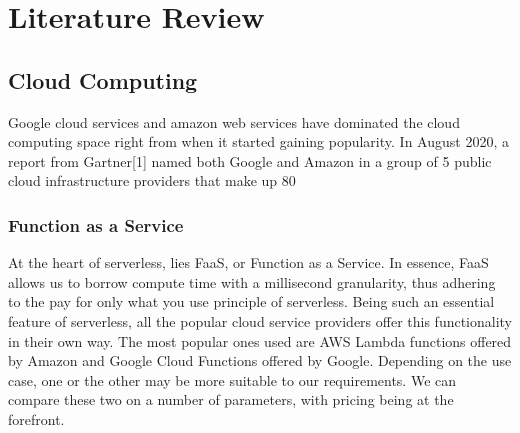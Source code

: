%
%
\chapter{Literature Review}%
%
\label{chapter:literature_review}

\section{Cloud Computing}
Google cloud services and amazon web services have dominated the cloud computing space right from when it started gaining popularity. In August 2020, a report from Gartner[1] named both Google and Amazon in a group of 5 public cloud infrastructure providers that make up 80%

\subsection{Function as a Service}

At the heart of serverless, lies FaaS, or Function as a Service. In essence, FaaS allows us to borrow compute time with a millisecond granularity, thus adhering to the pay for only what you use principle of serverless. Being such an essential feature of serverless, all the popular cloud service providers offer this functionality in their own way. The most popular ones used are AWS Lambda functions offered by Amazon and Google Cloud Functions offered by Google. Depending on the use case, one or the other may be more suitable to our requirements. We can compare these two on a number of parameters, with pricing being at the forefront.

\bigskip

